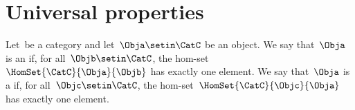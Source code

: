 
\section{Universal properties}
\publictodomessage



\begin{ctdefinition}
    \label{def:initial_terminal_object}
    Let~\CatC be a category and let~$\Obja \setin \CatC$ be an object.
    We say that~$\Obja$ is an  if, for all~$\Objb \setin\CatC$, the hom-set~$\HomSet{\CatC}{\Obja}{\Objb}$ has exactly one element.
    We say that~$\Obja$ is a  if, for all~$\Objc\setin\CatC$, the hom-set~$\HomSet{\CatC}{\Objc}{\Obja}$ has exactly one element.
\end{ctdefinition}

